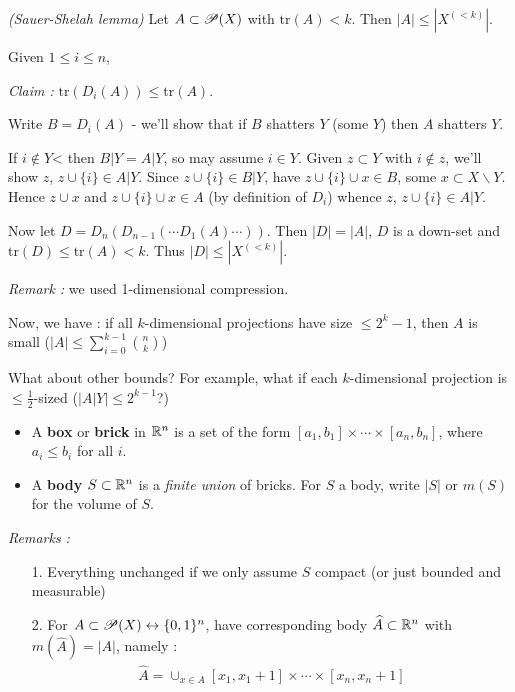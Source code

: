 \documentclass[12pt,a4paper]{report}
\renewcommand{\hat}{\widehat}
\newenvironment{proof}
{\begin{changemargin}{1cm}{0.5cm}
	}%
	{\end{changemargin}
}
\newenvironment{subproof}
{\begin{changemargin}{0.5cm}{0.5cm}
	}%
	{\end{changemargin}
}
\begin{document}
 \emph{(Sauer-Shelah lemma)} Let $A\subset \P(X)$ with $\text{tr}(A) <k$. Then $|A| \leq |X^{(<k)}|$.
\begin{proof}
\pf Given $1\leq i\leq n$,

\textit{Claim :} $\text{tr}(D_i(A)) \leq \text{tr}(A)$.
\begin{subproof}
\pf Write $B= D_i(A)$ - we'll show that if $B$ shatters $Y$ (some $Y$) then $A$ shatters $Y$.

If $i\not\in Y$< then $B|Y = A|Y$, so may assume $i\in Y$. Given $z\subset Y$ with $i\not\in z$, we'll show $z$, $z\cup \{i\} \in A|Y$. Since $z\cup \{i\} \in B|Y$, have $z\cup \{i\} \cup x \in B$, some $x \subset X \backslash Y$. Hence $z\cup x$ and $z\cup\{i\}\cup x\in A$ (by definition of $D_i$) whence $z$, $z\cup \{i\} \in A|Y$.
\end{subproof}
Now let $D = D_n(D_{n-1}(\cdots D_1(A) \cdots))$. Then $|D|=|A|$, $D$ is a down-set and $\text{tr}(D) \leq \text{tr}(A) <k$. Thus $|D| \leq |X^{(<k)}|$.

\eop
\end{proof}
\s

\textit{Remark :} we used 1-dimensional compression.
\s

Now, we have : if all $k$-dimensional projections have size $\leq 2^k-1$, then $A$ is small ($|A| \leq \sum_{i=0}^{k-1} {n \choose k}$)
\s

What about other bounds? For example, what if each $k$-dimensional projection is $\leq \frac{1}{2}$-sized ($\big| A|Y \big| \leq 2^{k-1}$?)
\s

\begin{itemize}
\item A \textbf{box} or \textbf{brick} in $\reals^n$ is a set of the form $[a_1,b_1] \times \cdots \times [a_n, b_n]$, where $a_i \leq b_i$ for all $i$. 
\item A \textbf{body} $S\subset \reals^n$ is a \emph{finite union} of bricks. For $S$ a body, write $|S|$ or $m(S)$ for the volume of $S$. 
\end{itemize}
\s

\textit{Remarks :}
\begin{itemize}
\item[1.] Everything unchanged if we only assume $S$ compact (or just bounded and measurable)
\item[2. ] For $A\subset \P(X) \leftrightarrow \{0,1\}^n$, have corresponding body $\hat{A} \subset \reals^n$ with $m(\hat{A}) = |A|$, namely :
\begin{align*}
\hat{A} = \cup_{x\in A} [x_1, x_1 +1] \times \cdots \times [x_n, x_n +1]
\end{align*} 
\end{itemize}
\s
\end{document}
